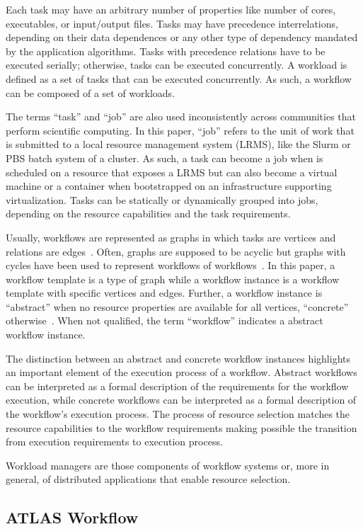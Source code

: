 Each task may have an arbitrary number of properties like number of cores,
executables, or input/output files. Tasks may have precedence interrelations,
depending on their data dependences or any other type of dependency mandated
by the application algorithms. Tasks with precedence relations have to be
executed serially; otherwise, tasks can be executed concurrently. A workload is
defined as a set of tasks that can be executed concurrently. As such, a
workflow can be composed of a set of workloads.

The terms ``task'' and ``job'' are also used inconsistently across communities
that perform scientific computing. In this paper, ``job'' refers to the unit of
work that is submitted to a local resource management system (LRMS), like the
Slurm or PBS batch system of a cluster. As such, a task can become a job when
is scheduled on a resource that exposes a LRMS but can also become a virtual
machine or a container when bootstrapped on an infrastructure supporting
virtualization. Tasks can be statically or dynamically grouped into jobs,
depending on the resource capabilities and the task requirements.

Usually, workflows are represented as graphs in which tasks are vertices and
relations are edges~\cite{}. Often, graphs are supposed to be acyclic but graphs
with cycles have been used to represent workflows of workflows~\cite{}. In this
paper, a workflow template is a type of graph while a workflow instance is a
workflow template with specific vertices and edges. Further, a workflow instance
is ``abstract'' when no resource properties are available for all vertices,
``concrete'' otherwise~\cite{}. When not qualified, the term ``workflow''
indicates a abstract workflow instance.

The distinction between an abstract and concrete workflow instances highlights
an important element of the execution process of a workflow. Abstract workflows
can be interpreted as a formal description of the requirements for the workflow
execution, while concrete workflows can be interpreted as a formal description of the workflow's execution process. The process of resource selection matches the resource capabilities to the workflow requirements making possible the transition from execution requirements to execution process.

Workload managers are those components of workflow systems or, more in general, of distributed applications that enable resource selection.

\subsection{ATLAS Workflow}

